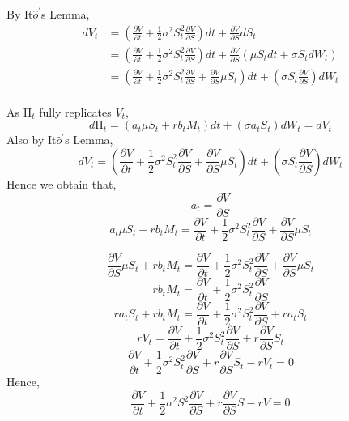 \begin{center}
By It$\hat{o}^{\prime}$s Lemma, 
\begin{equation*}
\begin{split}
dV_{t}
&= (\frac{\partial V}{\partial t}+\frac{1}{2}\sigma^{2}S_{t}^{2}\frac{\partial V}{\partial S})dt + \frac{\partial V}{\partial S}dS_{t}\\
&= (\frac{\partial V}{\partial t}+\frac{1}{2}\sigma^{2}S_{t}^{2}\frac{\partial V}{\partial S})dt + \frac{\partial V}{\partial S}(\mu S_{t}dt + \sigma S_{t}dW_{t})\\
&= (\frac{\partial V}{\partial t}+\frac{1}{2}\sigma^{2}S_{t}^{2}\frac{\partial V}{\partial S}+\frac{\partial V}{\partial S}\mu S_{t})dt + (\sigma S_{t}\frac{\partial V}{\partial S})dW_{t}\\
\end{split}
\end{equation*}
\end{center}

\begin{center}
As $\mathrm{\Pi}_{t}$ fully replicates $V_{t}$,
$$d\mathrm{\Pi}_{t} = (a_{t}\mu S_{t} + rb_{t}M_{t})dt + (\sigma a_{t}S_{t})dW_{t} = dV_{t}$$
Also by It$\hat{o}^{\prime}$s Lemma, 
$$dV_{t} = (\frac{\partial V}{\partial t}+\frac{1}{2}\sigma^{2}S_{t}^{2}\frac{\partial V}{\partial S}+\frac{\partial V}{\partial S}\mu S_{t})dt + (\sigma S_{t}\frac{\partial V}{\partial S})dW_{t}$$
Hence we obtain that,
$$a_{t} = \frac{\partial V}{\partial S}$$
$$a_{t}\mu S_{t} + rb_{t}M_{t} = \frac{\partial V}{\partial t}+\frac{1}{2}\sigma^{2}S_{t}^{2}\frac{\partial V}{\partial S}+\frac{\partial V}{\partial S}\mu S_{t}$$
\end{center}

\begin{center}
$$\frac{\partial V}{\partial S}\mu S_{t} + rb_{t}M_{t} = \frac{\partial V}{\partial t}+\frac{1}{2}\sigma^{2}S_{t}^{2}\frac{\partial V}{\partial S}+\frac{\partial V}{\partial S}\mu S_{t}$$
$$rb_{t}M_{t} = \frac{\partial V}{\partial t}+\frac{1}{2}\sigma^{2}S_{t}^{2}\frac{\partial V}{\partial S}$$
$$ra_{t}S_{t}+rb_{t}M_{t} = \frac{\partial V}{\partial t}+\frac{1}{2}\sigma^{2}S_{t}^{2}\frac{\partial V}{\partial S}+ra_{t}S_{t}$$
$$rV_{t} = \frac{\partial V}{\partial t}+\frac{1}{2}\sigma^{2}S_{t}^{2}\frac{\partial V}{\partial S}+r\frac{\partial V}{\partial S}S_{t}$$
$$\frac{\partial V}{\partial t}+\frac{1}{2}\sigma^{2}S_{t}^{2}\frac{\partial V}{\partial S}+r\frac{\partial V}{\partial S}S_{t}- rV_{t} = 0$$
Hence,
$$\frac{\partial V}{\partial t}+\frac{1}{2}\sigma^{2}S^{2}\frac{\partial V}{\partial S}+r\frac{\partial V}{\partial S}S- rV = 0$$
\end{center}
\newpage
